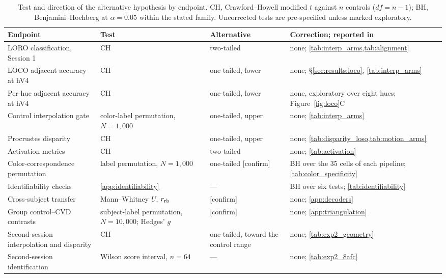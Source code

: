 \begin{table}[h]
\centering
\caption{Test and direction of the alternative hypothesis by endpoint. CH, Crawford--Howell modified $t$ against $n$ controls ($df = n - 1$); BH, Benjamini--Hochberg at $\alpha = 0.05$ within the stated family. Uncorrected tests are pre-specified unless marked exploratory.}
\label{tab:test_directions}
\small
\begin{tabular}{p{4.0cm}p{3.6cm}p{2.4cm}p{4.6cm}}
\toprule
Endpoint & Test & Alternative & Correction; reported in \\
\midrule
LORO classification, Session 1 & CH & two-tailed & none; \cref{tab:interp_arms,tab:alignment} \\
LOCO adjacent accuracy at hV4 & CH & one-tailed, lower & none; \S\ref{sec:results:loco}, \cref{tab:interp_arms} \\
Per-hue adjacent accuracy at hV4 & CH & one-tailed, lower & none, exploratory over eight hues; Figure~\ref{fig:loco}C \\
Control interpolation gate & color-label permutation, $N = 1{,}000$ & one-tailed, upper & none; \cref{tab:interp_arms} \\
Procrustes disparity & CH & one-tailed, upper & none; \cref{tab:disparity_loso,tab:motion_arms} \\
Activation metrics & CH & two-tailed & none; \cref{tab:activation} \\
Color-correspondence permutation & label permutation, $N = 1{,}000$ & one-tailed [confirm] & BH over the 35 cells of each pipeline; \cref{tab:color_specificity} \\
Identifiability checks & \cref{app:identifiability} & --- & BH over six tests; \cref{tab:identifiability} \\
Cross-subject transfer & Mann--Whitney $U$, $r_{\rm rb}$ & [confirm] & none; \cref{app:decoders} \\
Group control--CVD contrasts & subject-label permutation, $N = 10{,}000$; Hedges' $g$ & [confirm] & none; \cref{app:triangulation} \\
Second-session interpolation and disparity & CH & one-tailed, toward the control range & none; \cref{tab:exp2_geometry} \\
Second-session identification & Wilson score interval, $n = 64$ & --- & none; \cref{tab:exp2_8afc} \\
\bottomrule
\end{tabular}
\end{table}


